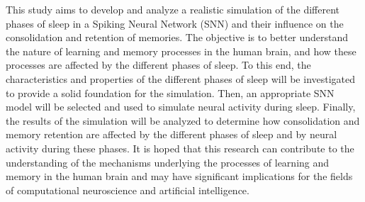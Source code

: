 This study aims to develop and analyze a realistic simulation of the different phases of sleep in a Spiking Neural Network (SNN)
and their influence on the consolidation and retention of memories. The objective is to better understand the nature of learning
and memory processes in the human brain, and how these processes are affected by the different phases of sleep. To this end, the
characteristics and properties of the different phases of sleep will be investigated to provide a solid foundation for the
simulation. Then, an appropriate SNN model will be selected and used to simulate neural activity during sleep. Finally, the
results of the simulation will be analyzed to determine how consolidation and memory retention are affected by the different
phases of sleep and by neural activity during these phases. It is hoped that this research can contribute to the understanding of
the mechanisms underlying the processes of learning and memory in the human brain and may have significant implications for the
fields of computational neuroscience and artificial intelligence.

